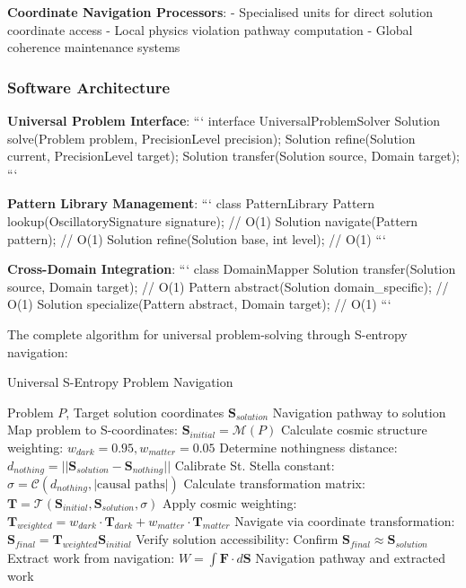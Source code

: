 \documentclass[11pt,a4paper]{article}
\theoremstyle{remark}
\begin{document}
\textbf{Coordinate Navigation Processors}:
- Specialised units for direct solution coordinate access
- Local physics violation pathway computation
- Global coherence maintenance systems

\subsubsection{Software Architecture}

\textbf{Universal Problem Interface}:
```
interface UniversalProblemSolver {
    Solution solve(Problem problem, PrecisionLevel precision);
    Solution refine(Solution current, PrecisionLevel target);
    Solution transfer(Solution source, Domain target);
}
```

\textbf{Pattern Library Management}:
```
class PatternLibrary {
    Pattern lookup(OscillatorySignature signature);  // O(1)
    Solution navigate(Pattern pattern);               // O(1)
    Solution refine(Solution base, int level);        // O(1)
}
```

\textbf{Cross-Domain Integration}:
```
class DomainMapper {
    Solution transfer(Solution source, Domain target);  // O(1)
    Pattern abstract(Solution domain_specific);         // O(1)
    Solution specialize(Pattern abstract, Domain target); // O(1)
}
```

The complete algorithm for universal problem-solving through S-entropy navigation:

\begin{algorithm}[H]
\caption{Universal S-Entropy Problem Navigation}
\begin{algorithmic}[1]
\REQUIRE Problem $P$, Target solution coordinates $\mathbf{S}_{solution}$
\ENSURE Navigation pathway to solution
\STATE Map problem to S-coordinates: $\mathbf{S}_{initial} = \mathcal{M}(P)$
\STATE Calculate cosmic structure weighting: $w_{dark} = 0.95, w_{matter} = 0.05$
\STATE Determine nothingness distance: $d_{nothing} = ||\mathbf{S}_{solution} - \mathbf{S}_{nothing}||$
\STATE Calibrate St. Stella constant: $\sigma = \mathcal{C}(d_{nothing}, |\text{causal paths}|)$
\STATE Calculate transformation matrix: $\mathbf{T} = \mathcal{T}(\mathbf{S}_{initial}, \mathbf{S}_{solution}, \sigma)$
\STATE Apply cosmic weighting: $\mathbf{T}_{weighted} = w_{dark} \cdot \mathbf{T}_{dark} + w_{matter} \cdot \mathbf{T}_{matter}$
\STATE Navigate via coordinate transformation: $\mathbf{S}_{final} = \mathbf{T}_{weighted} \mathbf{S}_{initial}$
\STATE Verify solution accessibility: Confirm $\mathbf{S}_{final} \approx \mathbf{S}_{solution}$
\STATE Extract work from navigation: $W = \int \mathbf{F} \cdot d\mathbf{S}$
\RETURN Navigation pathway and extracted work
\end{algorithmic}
\end{algorithm}
\end{document}
